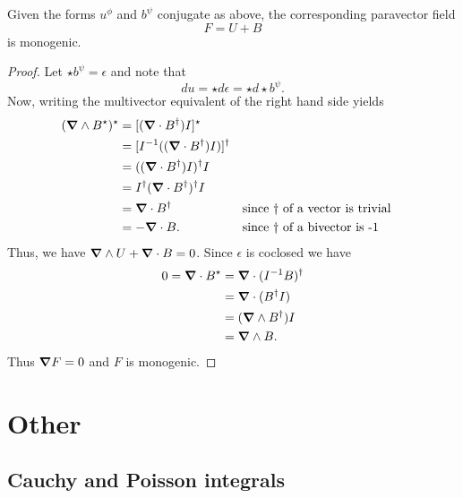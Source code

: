 \documentclass[12pt]{article}
\begin{document}
\begin{lemma}
Given the forms $u^\phi$ and $b^\psi$ conjugate as above, the corresponding paravector field
\[
F = U + B
\]
is monogenic.
\end{lemma}
\begin{proof}
Let $\star b^\psi = \epsilon$ and note that 
\[
d u = \star d \epsilon = \star d \star b^\psi.  
\]
Now, writing the multivector equivalent of the right hand side yields
\begin{align*}
(\boldsymbol{\nabla} \wedge B^\star )^\star &= [(\boldsymbol{\nabla} \cdot B^\dagger) I]^\star\\
    &= [I^{-1} ((\boldsymbol{\nabla} \cdot B^\dagger) I)]^\dagger\\
    &= ((\boldsymbol{\nabla} \cdot B^\dagger)I)^\dagger I\\
    &= I^\dagger (\boldsymbol{\nabla} \cdot B^\dagger)^\dagger I\\
    &= \boldsymbol{\nabla} \cdot B^\dagger && \textrm{since $\dagger$ of a vector is trivial}\\
    &= -\boldsymbol{\nabla} \cdot B. && \textrm{since $\dagger$ of a bivector is -1}
\end{align*}
Thus, we have $\boldsymbol{\nabla} \wedge U + \boldsymbol{\nabla} \cdot B = 0$. Since $\epsilon$ is coclosed we have
\begin{align*}
0=\boldsymbol{\nabla} \cdot B^\star &= \boldsymbol{\nabla} \cdot (I^{-1} B)^\dagger \\
    &= \boldsymbol{\nabla} \cdot (B^\dagger I)\\
    &= (\boldsymbol{\nabla} \wedge B^\dagger) I\\
    &= \boldsymbol{\nabla} \wedge B.
\end{align*}
Thus $\boldsymbol{\nabla} F =0$ and $F$ is monogenic.
\end{proof}





\section{Other}

\subsection{Cauchy and Poisson integrals}
\end{document}
